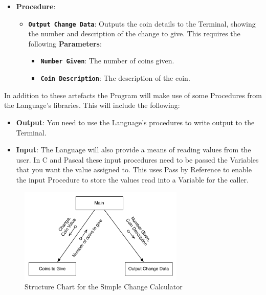 \begin{itemize}
\begin{itemize}
\begin{itemize}
    \end{itemize}
  \end{itemize}
  \item \textbf{Procedure}:
  \begin{itemize}
    \item \texttt{\textbf{Output Change Data}}: Outputs the coin details to the Terminal, showing the number and description of the change to give. This requires the following \textbf{Parameters}:
    \begin{itemize}
      \item \textbf{\texttt{Number Given}}: The number of coins given.
      \item \textbf{\texttt{Coin Description}}: The description of the coin.
    \end{itemize}
  \end{itemize}
\end{itemize}

In addition to these artefacts the Program will make use of some Procedures from the Language's libraries. This will include the following:
\begin{itemize}
  \item \textbf{Output}: You need to use the Language's procedures to write output to the Terminal.
  \item \textbf{Input}: The Language will also provide a means of reading values from the user. In C and Pascal these input procedures need to be passed the Variables that you want the value assigned to. This uses Pass by Reference to enable the input Procedure to store the values read into a Variable for the caller.
\end{itemize}



\begin{figure}[p]
   \centering
   \includegraphics[width=0.7\textwidth]{./topics/storing-using-data/images/SimpleCalcStructure} 
   \caption{Structure Chart for the Simple Change Calculator}
   \label{fig:simple-change-structure}
\end{figure}

